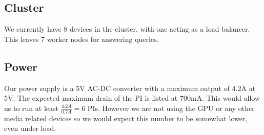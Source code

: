 \subsection{Cluster}
We currently have 8 devices in the cluster, with one acting as a load balancer. This leaves 7 worker nodes for answering queries.

\subsection{Power}
Our power supply is a 5V AC-DC converter with a maximum output of 4.2A at 5V. The expected maximum drain of the PI is listed at 700mA\cite{raspi_power_drain}. This would allow us to run at least $\frac{4.2A}{0.7A}=6$ PIs.
However we are not using the GPU or any other media related devices so we would expect this number to be somewhat lower, even under load.
